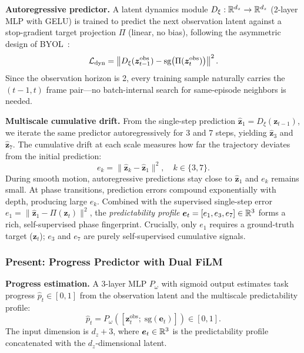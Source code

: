 \textbf{Autoregressive predictor.} A latent dynamics module $D_\xi: \mathbb{R}^{d_z} \to \mathbb{R}^{d_z}$ (2-layer MLP with GELU) is trained to predict the next observation latent against a stop-gradient target projection $\Pi$ (linear, no bias), following the asymmetric design of BYOL~\cite{grill2020bootstrap}:
\begin{equation}
    \mathcal{L}_{\text{dyn}} = \left\| D_\xi(\bm{z}_{t-1}^{\text{obs}}) - \text{sg}\!\left(\Pi(\bm{z}_{t}^{\text{obs}})\right) \right\|^2.
    \label{eq:dynamics_loss}
\end{equation}
Since the observation horizon is 2, every training sample naturally carries the $(t{-}1, t)$ frame pair---no batch-internal search for same-episode neighbors is needed.

\textbf{Multiscale cumulative drift.} From the single-step prediction $\hat{\bm{z}}_1 = D_\xi(\bm{z}_{t-1})$, we iterate the same predictor autoregressively for 3 and 7 steps, yielding $\hat{\bm{z}}_3$ and $\hat{\bm{z}}_7$. The cumulative drift at each scale measures how far the trajectory deviates from the initial prediction:
\begin{equation}
    e_k = \| \hat{\bm{z}}_k - \hat{\bm{z}}_1 \|^2, \quad k \in \{3, 7\}.
    \label{eq:multiscale_error}
\end{equation}
During smooth motion, autoregressive predictions stay close to $\hat{\bm{z}}_1$ and $e_k$ remains small. At phase transitions, prediction errors compound exponentially with depth, producing large $e_k$. Combined with the supervised single-step error $e_1 = \| \hat{\bm{z}}_1 - \Pi(\bm{z}_t) \|^2$, the \emph{predictability profile} $\bm{e}_t = [e_1, e_3, e_7] \in \mathbb{R}^3$ forms a rich, self-supervised phase fingerprint. Crucially, only $e_1$ requires a ground-truth target ($\bm{z}_t$); $e_3$ and $e_7$ are purely self-supervised cumulative signals.

\subsubsection{Present: Progress Predictor with Dual FiLM}
\label{sec:progress}

\textbf{Progress estimation.} A 3-layer MLP $P_\omega$ with sigmoid output estimates task progress $\hat{p}_t \in [0,1]$ from the observation latent and the multiscale predictability profile:
\begin{equation}
    \hat{p}_t = P_\omega([\bm{z}_t^{\text{obs}};\; \text{sg}(\bm{e}_t)]) \in [0,1].
    \label{eq:progress_pred}
\end{equation}
The input dimension is $d_z + 3$, where $\bm{e}_t \in \mathbb{R}^3$ is the predictability profile concatenated with the $d_z$-dimensional latent.

